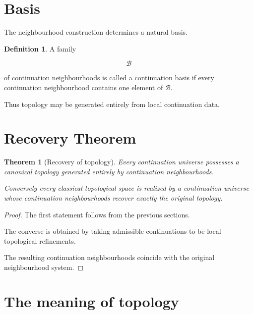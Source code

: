 \documentclass[13pt,openany]{book}
\theoremstyle{plain}
\newtheorem{theorem}{Theorem}[chapter]
\theoremstyle{definition}
\newtheorem{definition}{Definition}[chapter]
\begin{document}
\section{Basis}

The neighbourhood construction determines a natural basis.

\begin{definition}

A family

\[
\mathcal B
\]

of continuation neighbourhoods is called a continuation basis if every continuation neighbourhood contains one element of $\mathcal B$.

\end{definition}

Thus topology may be generated entirely from local continuation data.

\section{Recovery Theorem}

\begin{theorem}[Recovery of topology]

Every continuation universe possesses a canonical topology generated entirely by continuation neighbourhoods.

Conversely every classical topological space is realized by a continuation universe whose continuation neighbourhoods recover exactly the original topology.

\end{theorem}

\begin{proof}

The first statement follows from the previous sections.

The converse is obtained by taking admissible continuations to be local topological refinements.

The resulting continuation neighbourhoods coincide with the original neighbourhood system.

\end{proof}

\section{The meaning of topology}
\end{document}
